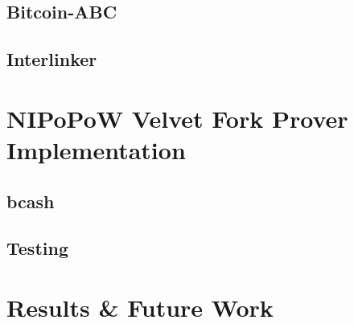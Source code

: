 \documentclass[12pt]{report}
\begin{document}
\section{Bitcoin-ABC}
\section{Interlinker}

\chapter{NIPoPoW Velvet Fork Prover Implementation}

\section{bcash}
\section{Testing}

\chapter{Results \& Future Work}


\end{document}
